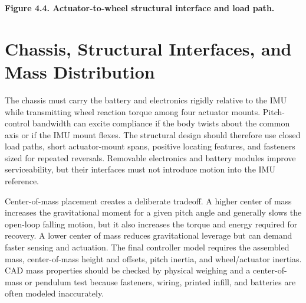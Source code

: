 \begin{center}\singlespacing
{}
\textbf{Figure 4.4. Actuator-to-wheel structural interface and load path.}
\end{center}

\section{Chassis, Structural Interfaces, and Mass Distribution}\label{chassis-structural-interfaces-and-mass-distribution}

The chassis must carry the battery and electronics rigidly relative to
the IMU while transmitting wheel reaction torque among four actuator
mounts. Pitch-control bandwidth can excite compliance if the body twists
about the common axis or if the IMU mount flexes. The structural design
should therefore use closed load paths, short actuator-mount spans,
positive locating features, and fasteners sized for repeated reversals.
Removable electronics and battery modules improve serviceability, but
their interfaces must not introduce motion into the IMU reference.

Center-of-mass placement creates a deliberate tradeoff. A higher center
of mass increases the gravitational moment for a given pitch angle and
generally slows the open-loop falling motion, but it also increases the
torque and energy required for recovery. A lower center of mass reduces
gravitational leverage but can demand faster sensing and actuation. The
final controller model requires the assembled mass, center-of-mass
height and offsets, pitch inertia, and wheel\slash{}actuator inertias. CAD mass
properties should be checked by physical weighing and a center-of-mass
or pendulum test because fasteners, wiring, printed infill, and
batteries are often modeled inaccurately.

